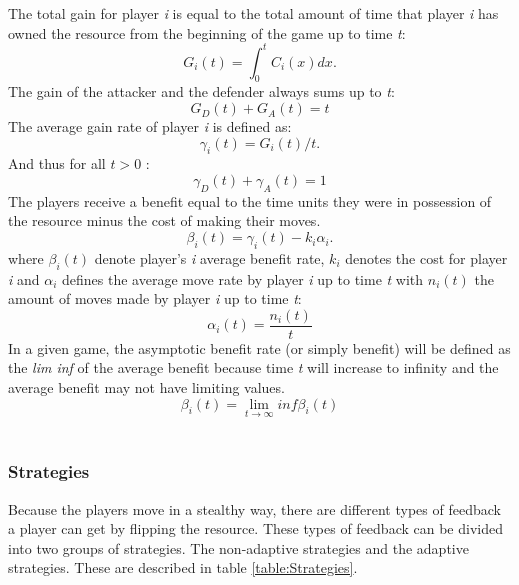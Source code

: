 The total gain for player \textit{i} is equal to the total amount of time that player \textit{i} has owned the resource from the beginning of the game up to time \textit{t}:
\begin{equation}\label{first}
G_{i}(t) = \int_0^t \! C_{i}(x) dx.
\end{equation}
The gain of the attacker and the defender always sums up to \textit{t}:
\begin{equation}\label{first}
G_{D}(t) + G_{A}(t) = t
\end{equation}
The average gain rate of player \textit{i} is defined as:
\begin{equation}\label{first}
\gamma_{i}(t) = G_{i}(t)/t.
\end{equation}
And thus for all $t > 0$ :
\begin{equation}\label{first}
\gamma_{D}(t) + \gamma_{A}(t) = 1
\end{equation}
The players receive a benefit equal to the time units they were in possession of the resource minus the cost of making their moves. 
\begin{equation}\label{first}
\beta_{i}(t) = \gamma_{i}(t) - k_{i}\alpha_{i}.
\end{equation}
where  $\beta_{i}(t)$ denote player's \textit{i} average benefit rate, $k_{i}$ denotes the cost for player \textit{i} and $\alpha_{i}$ defines the average move rate by player \textit{i} up to time \textit{t} with $n_{i}(t)$ the amount of moves made by player \textit{i} up to time \textit{t}:
\begin{equation}
\alpha_{i}(t) = \dfrac{n_{i}(t)}{t}
\end{equation}
In a given game, the asymptotic benefit rate (or simply benefit) will be defined as the \textit{lim inf} of the average benefit because time\textit{ t} will increase to infinity and the average benefit may not have limiting values.
\begin{equation}
\beta_{i}(t)  = \lim_{t \to \infty} inf \beta_{i}(t) 
\end{equation}
\\


\subsubsection{Strategies}
Because the players move in a stealthy way, there are different types of feedback a player can get by flipping the resource. These types of feedback can be divided into two groups of strategies. The non-adaptive strategies and the adaptive strategies. These are described in table \ref{table:Strategies}.\\

